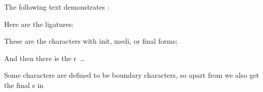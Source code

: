 \documentclass{article}
\begin{document}
\noindent
The following text demonstrates :
\bigskip



\noindent
Here are the ligatures:\par
{}

\noindent
These are the characters with init, medi, or final forms:\par
{}

\noindent
And then there is the r~\ldots\par
{}

\noindent
Some characters are defined to be boundary characters, so apart from  we also get the final s in 
\end{document}
